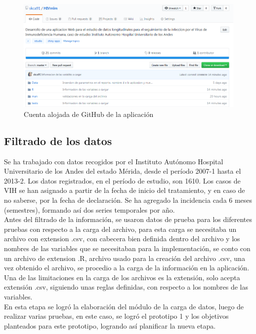 \begin{figure}[H]
\centering
\includegraphics[scale=0.6]{github.png}
\caption{Cuenta alojada de GitHub de la aplicaci\'on}
\end{figure}


\subsection{Filtrado de los datos}

Se ha trabajado con datos recogidos por el Instituto Aut\'onomo Hospital Universitario de los Andes del estado M\'erida, desde el per\'iodo 2007-1 hasta el 2013-2. Los datos registrados, en el per\'iodo de estudio, son 1610. Los casos de VIH se han asignado a partir de la fecha de inicio del tratamiento, y en caso de no saberse, por la fecha de declaraci\'on. Se ha agregado la incidencia cada 6 meses (semestres), formando as\'i dos series temporales por año.\\

Antes del filtrado de la informaci\'on, se usaron datos de prueba para los diferentes pruebas con respecto a la carga del archivo, para esta carga se necesitaba un archivo con extension .csv, con cabecera bien definida dentro del archivo y los nombres de las variables que se necesitaban para la implementaci\'on, se conto con un archivo de extension .R, archivo usado para la creaci\'on del archivo .csv, una vez obtenido el archivo, se procedio a la carga de la informaci\'on en la aplicaci\'on.
\\

Una de las limitaciones en la carga de los archivos es la extensi\'on, solo acepta extensi\'on .csv, siguiendo unas reglas definidas, con respecto a los nombres de las variables.
\\

En esta etapa se logr\'o la elaboraci\'on del m\'odulo de la carga de datos, luego de realizar varias pruebas, en este caso, se logr\'o el prototipo 1 y los objetivos planteados para este prototipo, logrando as\'i planificar la nueva etapa.
\\


